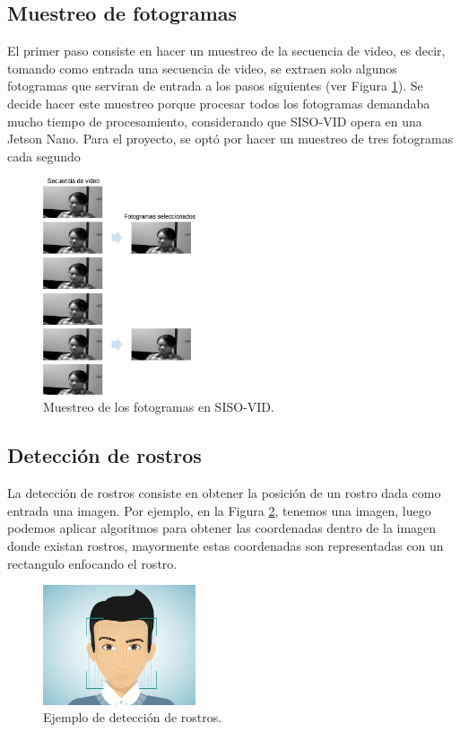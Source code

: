 \documentclass{article}
\begin{document}
	\subsection{Muestreo de fotogramas}
	
	El primer paso consiste en hacer un muestreo de la secuencia de video, es decir, tomando como entrada una secuencia de video, se extraen solo algunos fotogramas que serviran de entrada a los pasos siguientes (ver Figura \ref{fig:muestreo}). Se decide hacer este muestreo porque procesar todos los fotogramas demandaba mucho tiempo de procesamiento, considerando que SISO-VID opera en una Jetson Nano. Para el proyecto, se optó por hacer un muestreo de tres fotogramas cada segundo
	
		
	\begin{figure}[H]
		\centering
		\includegraphics[width=0.4\textwidth]{img/muestreo}		
		\caption{Muestreo de los fotogramas en SISO-VID.}
		\label{fig:muestreo}
	\end{figure}
		
	
	\subsection{Detección de rostros}
	
	La detección de rostros consiste en obtener la posición  de un rostro dada como entrada una imagen. Por ejemplo, en la Figura \ref{fig:face}, tenemos una imagen, luego podemos aplicar algoritmos para obtener las coordenadas dentro de la imagen donde existan rostros, mayormente estas coordenadas son representadas con un rectangulo enfocando el rostro. 
	
	\begin{figure}[H]
		\centering
		\includegraphics[width=0.4\textwidth]{img/face}		
		\caption{Ejemplo de detección de rostros.}
		\label{fig:face}
	\end{figure}
\end{document}
